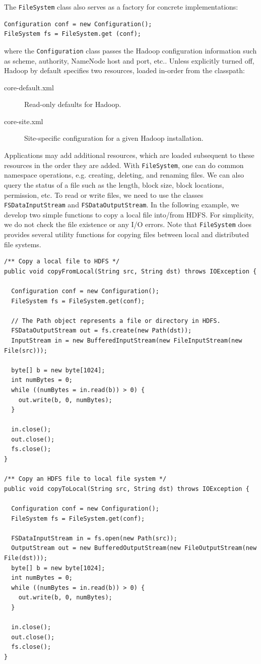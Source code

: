\documentclass[11pt]{book}
\begin{document}
The \texttt{FileSystem} class also serves as a factory for concrete implementations:
\begin{lstlisting}
Configuration conf = new Configuration();
FileSystem fs = FileSystem.get (conf);
\end{lstlisting}
where the \texttt{Configuration} class passes the Hadoop configuration information such as scheme, authority, NameNode host and port, etc.. Unless explicitly turned off, Hadoop by default specifies two resources, loaded in-order from the classpath:
\begin{description}
\item[core-default.xml] Read-only defaults for Hadoop.
\item[core-site.xml] Site-specific configuration for a given Hadoop installation.
\end{description}
Applications may add additional resources, which are loaded subsequent to these resources in the order they are added. With \texttt{FileSystem}, one can do common namespace operations, e.g. creating, deleting, and renaming files. We can also query the status of a file such as the length, block size, block locations, permission, etc. To read or write files, we need to use the classes \texttt{FSDataInputStream} and \texttt{FSDataOutputStream}. In the following example, we develop two simple functions to copy a local file into/from HDFS. For simplicity, we do not check the file existence or any I/O errors. Note that \texttt{FileSystem} does provides several utility functions for copying files between local and distributed file systems.

\begin{lstlisting}
/** Copy a local file to HDFS */
public void copyFromLocal(String src, String dst) throws IOException {
 
  Configuration conf = new Configuration();
  FileSystem fs = FileSystem.get(conf);
  
  // The Path object represents a file or directory in HDFS.
  FSDataOutputStream out = fs.create(new Path(dst));
  InputStream in = new BufferedInputStream(new FileInputStream(new File(src)));
 
  byte[] b = new byte[1024];
  int numBytes = 0;
  while ((numBytes = in.read(b)) > 0) {
    out.write(b, 0, numBytes);
  }
 
  in.close();
  out.close();
  fs.close();
}

/** Copy an HDFS file to local file system */
public void copyToLocal(String src, String dst) throws IOException {
 
  Configuration conf = new Configuration();
  FileSystem fs = FileSystem.get(conf);
 
  FSDataInputStream in = fs.open(new Path(src));
  OutputStream out = new BufferedOutputStream(new FileOutputStream(new File(dst)));
  byte[] b = new byte[1024];
  int numBytes = 0;
  while ((numBytes = in.read(b)) > 0) {
    out.write(b, 0, numBytes);
  }
 
  in.close();
  out.close();
  fs.close();
}
\end{lstlisting}
\end{document}
